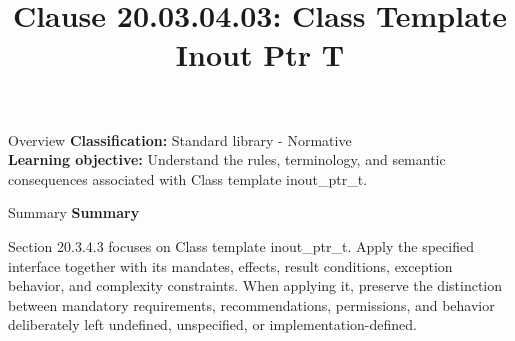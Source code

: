 \documentclass[10pt,letterpaper]{article}
\title{Clause 20.03.04.03: Class Template Inout Ptr T}
\author{}
\date{}
\begin{document}
\maketitle
\begin{CornellOverviewBox}{Overview}
\textbf{Classification:} Standard library - Normative\\[2pt]
\textbf{Learning objective:} Understand the rules, terminology, and semantic consequences associated with Class template inout\_ptr\_t.
\end{CornellOverviewBox}\begin{CornellSummaryBox}{Summary}
{\sffamily\bfseries\color{Accent} Summary}\par\vspace{3pt}Section 20.3.4.3 focuses on Class template inout\_ptr\_t. Apply the specified interface together with its mandates, effects, result conditions, exception behavior, and complexity constraints. When applying it, preserve the distinction between mandatory requirements, recommendations, permissions, and behavior deliberately left undefined, unspecified, or implementation-defined.
\end{CornellSummaryBox}
\end{document}
